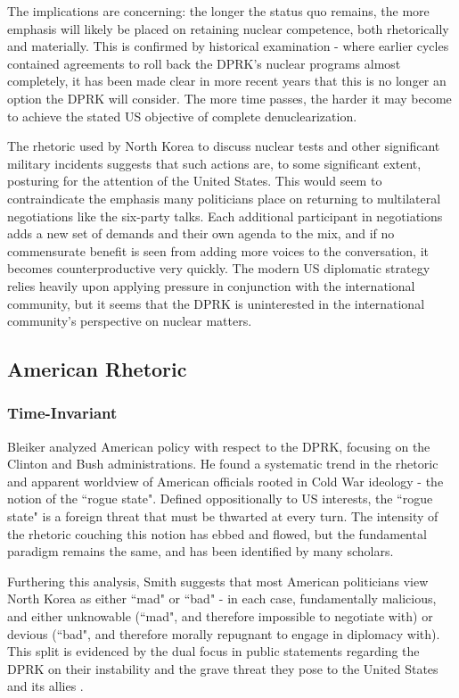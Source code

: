 \documentclass{article}
\begin{document}
The implications are concerning: the longer the status quo remains, the more emphasis will likely be placed on retaining nuclear competence, both rhetorically and materially. This is confirmed by historical examination - where earlier cycles contained agreements to roll back the DPRK's nuclear programs almost completely, it has been made clear in more recent years that this is no longer an option the DPRK will consider. The more time passes, the harder it may become to achieve the stated US objective of complete denuclearization.

The rhetoric used by North Korea to discuss nuclear tests and other significant military incidents suggests that such actions are, to some significant extent, posturing for the attention of the United States. This would seem to contraindicate the emphasis many politicians place on returning to multilateral negotiations like the six-party talks. Each additional participant in negotiations adds a new set of demands and their own agenda to the mix, and if no commensurate benefit is seen from adding more voices to the conversation, it becomes counterproductive very quickly. The modern US diplomatic strategy relies heavily upon applying pressure in conjunction with the international community, but it seems that the DPRK is uninterested in the international community's perspective on nuclear matters.


\subsection{American Rhetoric}
\subsubsection{Time-Invariant}

Bleiker \cite{bleiker} analyzed American policy with respect to the DPRK, focusing on the Clinton and Bush administrations. He found a systematic trend in the rhetoric and apparent worldview of American officials rooted in Cold War ideology - the notion of the ``rogue state". Defined oppositionally to US interests, the ``rogue state" is a foreign threat that must be thwarted at every turn. The intensity of the rhetoric couching this notion has ebbed and flowed, but the fundamental paradigm remains the same, and has been identified by many scholars\cite{bleiker,cumings,sigal,smith}.

Furthering this analysis, Smith suggests that most American politicians view North Korea as either ``mad" or ``bad" - in each case, fundamentally malicious, and either unknowable (``mad", and therefore impossible to negotiate with) or devious (``bad", and therefore morally repugnant to engage in diplomacy with). This split is evidenced by the dual focus in public statements regarding the DPRK on their instability and the grave threat they pose to the United States and its allies \cite{smith}. 
\end{document}

